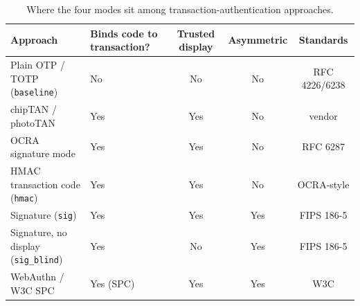 \begin{table}[htbp]
\centering
\caption{Where the four modes sit among transaction-authentication approaches.}
\label{tab:compare}
\small
\begin{tabularx}{\linewidth}{@{}lXccc@{}}
\toprule
Approach & Binds code to transaction? & Trusted display & Asymmetric & Standards \\
\midrule
Plain OTP / TOTP (\texttt{baseline})   & No  & No  & No  & RFC 4226/6238 \\
chipTAN / photoTAN                     & Yes & Yes & No  & vendor \\
OCRA signature mode                    & Yes & Yes & No  & RFC 6287 \\
HMAC transaction code (\texttt{hmac})  & Yes & Yes & No  & OCRA-style \\
Signature (\texttt{sig})               & Yes & Yes & Yes & FIPS 186-5 \\
Signature, no display (\texttt{sig\_blind}) & Yes & No & Yes & FIPS 186-5 \\
WebAuthn / W3C SPC                     & Yes (SPC) & Yes & Yes & W3C \\
\bottomrule
\end{tabularx}
\end{table}
